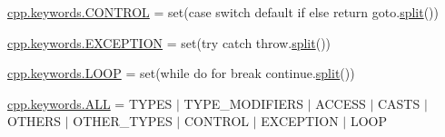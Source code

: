 \begin{DoxyCompactItemize}
\mbox{\hyperlink{namespacecpp_1_1keywords_a374dfe9c96681079802ba4724287b8ff}{cpp.\+keywords.\+C\+O\+N\+T\+R\+OL}} = set(\textquotesingle{}case switch default if else return goto\textquotesingle{}.\mbox{\hyperlink{_input_8h_aec2fd8cd9140a1b535dc54a924396f40}{split}}())
\item 
\mbox{\hyperlink{namespacecpp_1_1keywords_a2665fb8a25a4dae03fa5d3dc975c537c}{cpp.\+keywords.\+E\+X\+C\+E\+P\+T\+I\+ON}} = set(\textquotesingle{}try catch throw\textquotesingle{}.\mbox{\hyperlink{_input_8h_aec2fd8cd9140a1b535dc54a924396f40}{split}}())
\item 
\mbox{\hyperlink{namespacecpp_1_1keywords_af0164c05398a2291487b76414102d555}{cpp.\+keywords.\+L\+O\+OP}} = set(\textquotesingle{}while do for break continue\textquotesingle{}.\mbox{\hyperlink{_input_8h_aec2fd8cd9140a1b535dc54a924396f40}{split}}())
\item 
\mbox{\hyperlink{namespacecpp_1_1keywords_a2e8727b78fb9434c99ac8518c6dd1ecc}{cpp.\+keywords.\+A\+LL}} = T\+Y\+P\+ES $\vert$ T\+Y\+P\+E\+\_\+\+M\+O\+D\+I\+F\+I\+E\+RS $\vert$ A\+C\+C\+E\+SS $\vert$ C\+A\+S\+TS $\vert$ O\+T\+H\+E\+RS $\vert$ O\+T\+H\+E\+R\+\_\+\+T\+Y\+P\+ES $\vert$ C\+O\+N\+T\+R\+OL $\vert$ E\+X\+C\+E\+P\+T\+I\+ON $\vert$ L\+O\+OP
\end{DoxyCompactItemize}
